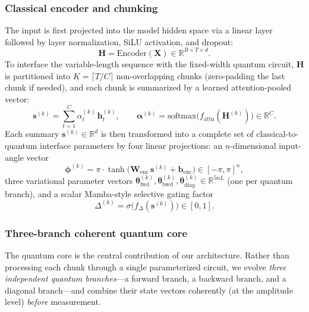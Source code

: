 \documentclass[conference]{IEEEtran}
\begin{document}
\subsubsection{Classical encoder and chunking}
The input is first projected into the model hidden space via a linear layer followed by layer normalization, SiLU activation, and dropout:
\begin{equation}
    \mathbf{H} = \mathrm{Encoder}(\mathbf{X}) \in \mathbb{R}^{B \times T \times d}.
    \label{eq:input_proj}
\end{equation}
To interface the variable-length sequence with the fixed-width quantum circuit, $\mathbf{H}$ is partitioned into $K = \lceil T/C \rceil$ non-overlapping chunks (zero-padding the last chunk if needed), and each chunk is summarized by a learned attention-pooled vector:
\begin{equation}
    \mathbf{s}^{(k)} = \sum_{t=1}^{C} \alpha_t^{(k)}\, \mathbf{h}_t^{(k)},
    \qquad
    \boldsymbol{\alpha}^{(k)} = \mathrm{softmax}\!\big(f_{\mathrm{attn}}(\mathbf{H}^{(k)})\big) \in \mathbb{R}^{C}.
    \label{eq:chunk_summary}
\end{equation}
Each summary $\mathbf{s}^{(k)} \in \mathbb{R}^{d}$ is then transformed into a complete set of classical-to-quantum interface parameters by four linear projections: an $n$-dimensional input-angle vector
\begin{equation}
    \boldsymbol{\phi}^{(k)} = \pi\cdot\tanh\!\big(\mathbf{W}_{\text{enc}}\,\mathbf{s}^{(k)} + \mathbf{b}_{\text{enc}}\big) \in [-\pi, \pi]^{n},
    \label{eq:input_angles}
\end{equation}
three variational parameter vectors $\boldsymbol{\theta}_{\text{fwd}}^{(k)}, \boldsymbol{\theta}_{\text{bwd}}^{(k)}, \boldsymbol{\theta}_{\text{diag}}^{(k)} \in \mathbb{R}^{5nL}$ (one per quantum branch), and a scalar Mamba-style selective gating factor
\begin{equation}
    \Delta^{(k)} = \sigma\!\big(f_{\Delta}(\mathbf{s}^{(k)})\big) \in [0, 1].
    \label{eq:delta}
\end{equation}

\subsubsection{Three-branch coherent quantum core}
\label{sec:qm_core}
The quantum core is the central contribution of our architecture. Rather than processing each chunk through a single parameterized circuit, we evolve \emph{three independent quantum branches}---a forward branch, a backward branch, and a diagonal branch---and combine their state vectors coherently (at the amplitude level) \emph{before} measurement.
\end{document}
